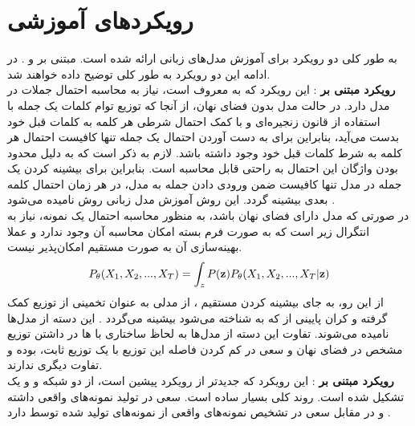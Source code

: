 \section{رویکردهای آموزشی}
به طور کلی دو رویکرد برای آموزش مدل‌های زبانی ارائه شده است. مبتنی بر \likelihood{} و
.
در ادامه این دو رویکرد به طور کلی توضیح داده خواهند شد.
\\
{\bf رویکرد مبتنی بر \likelihood{}}:
این رویکرد که به
معروف است، نیاز به محاسبه احتمال جملات در مدل دارد. در حالت مدل بدون فضای نهان، از آنجا که توزیع توام کلمات یک جمله با استفاده از قانون زنجیره‌ای و با کمک احتمال شرطی هر کلمه به کلمات قبل خود بدست می‌آید، بنابراین برای به دست آوردن احتمال یک جمله تنها کافیست احتمال هر کلمه به شرط کلمات قبل خود وجود داشته باشد. لازم به ذکر است که به دلیل محدود بودن واژگان این احتمال به راحتی قابل محاسبه است. بنابراین برای بیشینه کردن \likelihood{} یک جمله در مدل تنها کافیست ضمن ورودی دادن جمله به مدل، در هر زمان احتمال کلمه بعدی بیشینه گردد. این روش آموزش مدل زبانی روش
نامیده می‌شود \cite{teacher_force}.
\\
در صورتی که مدل دارای فضای نهان باشد، به منظور محاسبه احتمال یک نمونه، نیاز به انتگرال زیر است که به صورت فرم بسته امکان محاسبه آن وجود ندارد و عملا بهینه‌سازی آن به صورت مستقیم امکان‌پذیر نیست.
\begin{align}
	P_\theta(X_1, X_2, ... , X_T) = \int_z P({\bf z})P_\theta(X_1, X_2, ... , X_T|{\bf z})
\end{align}
از این رو، به جای بیشینه کردن مستقیم \likelihood{}، از مدلی به عنوان تخمینی از توزیع
کمک گرفته و کران پایینی از \likelihood{} که به  شناخته می‌شود بیشینه می‌گردد \cite{vae}. این دسته از مدل‌ها
نامیده می‌شوند. تفاوت این دسته از مدل‌ها به لحاظ ساختاری با
ها
در داشتن توزیع مشخص در فضای نهان و سعی در کم کردن فاصله این توزیع با یک توزیع ثابت، بوده و تفاوت دیگری ندارند.
\\
{\bf رویکرد مبتنی بر \gan{}}:
این رویکرد که جدید‌تر از رویکرد پیشین است، از دو شبکه \generator{} و
و یک \minmaxgame{} تشکیل شده است. روند کلی بسیار ساده است. \generator{} سعی در تولید نمونه‌های واقعی داشته و در مقابل \discriminator{} سعی در تشخیص نمونه‌های واقعی از نمونه‌های تولید شده توسط \generator{} دارد \cite{gan}.
\\
